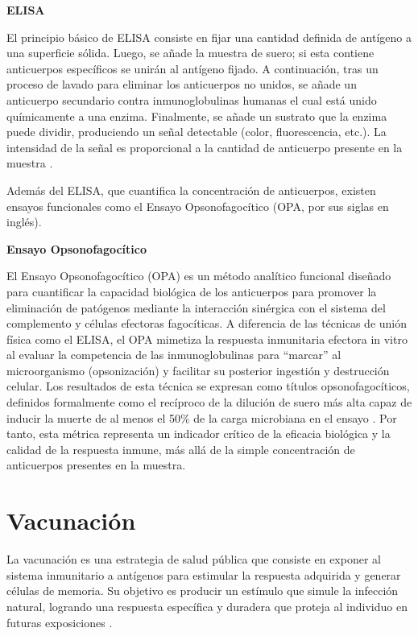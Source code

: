 \vspace{\baselineskip}
\textbf{ELISA}
\vspace{\baselineskip}

El principio básico de ELISA consiste en fijar una cantidad definida de antígeno a una superficie sólida. Luego, se añade la muestra de suero; si esta contiene anticuerpos específicos se unirán al antígeno fijado. A continuación, tras un proceso de lavado para eliminar los anticuerpos no unidos, se añade un anticuerpo secundario contra inmunoglobulinas humanas el cual está unido químicamente a una enzima. Finalmente, se añade un sustrato que la enzima puede dividir, produciendo un señal detectable (color, fluorescencia, etc.).
La intensidad de la señal es proporcional a la cantidad de anticuerpo presente en la muestra \cite{nauta2020}.

Además del ELISA, que cuantifica la concentración de anticuerpos, existen ensayos funcionales como el Ensayo Opsonofagocítico (OPA, por sus siglas en inglés).

\vspace{\baselineskip}
\textbf{Ensayo Opsonofagocítico}
\vspace{\baselineskip}

El Ensayo Opsonofagocítico (OPA) es un método analítico funcional diseñado para cuantificar la capacidad biológica de los anticuerpos para promover la eliminación de patógenos mediante la interacción sinérgica con el sistema del complemento y células efectoras fagocíticas. A diferencia de las técnicas de unión física como el ELISA, el OPA mimetiza la respuesta inmunitaria efectora in vitro al evaluar la competencia de las inmunoglobulinas para  \enquote{marcar} al microorganismo (opsonización) y facilitar su posterior ingestión y destrucción celular. Los resultados de esta técnica se expresan como títulos opsonofagocíticos, definidos formalmente como el recíproco de la dilución de suero más alta capaz de inducir la muerte de al menos el 50\% de la carga microbiana en el ensayo \cite{romerosteiner1997}. Por tanto, esta métrica representa un indicador crítico de la eficacia biológica y la calidad de la respuesta inmune, más allá de la simple concentración de anticuerpos presentes en la muestra.

\section{Vacunación}

La vacunación es una estrategia de salud pública que consiste en exponer al sistema inmunitario a antígenos para estimular la respuesta adquirida y generar células de memoria. Su objetivo es producir un estímulo que simule la infección natural, logrando una respuesta específica y duradera que proteja al individuo en futuras exposiciones \cite{aep2026}.

